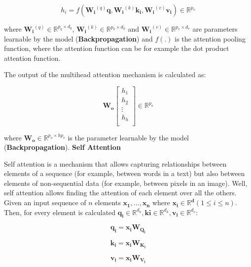 \begin{equation}
h_{i}=f(\mathbf{W_{i}}^{(q)}\mathbf{q},\mathbf{W_{i}}^{(k)}\mathbf{k_{i}},\mathbf{W_{i}}^{(v)}\mathbf{v_{i}}) \in \mathbb{R}^{p_{v}}
\end{equation}

where $\mathbf{W_{i}}^{(q)} \in \mathbb{R}^{p_{q} \times d_{q}}$, $\mathbf{W_{i}}^{(k)} \in \mathbb{R}^{p_{k} \times d_{k}}$ and $\mathbf{W_{i}}^{(v)} \in \mathbb{R}^{p_{v} \times d_{v}}$ are parameters learnable by the model (\textbf{Backpropagation}) and $f(.)$ is the attention pooling function, where the attention function can be for example the dot product attention function. 

The output of the multihead attention mechanism is calculated as:

\begin{equation}
    \mathbf{W_{o}} \begin{bmatrix}
h_1 \\
h_2 \\
\vdots \\
h_h \\
\end{bmatrix} \in \mathbb{R}^{p_{o}}
\end{equation}

where $\mathbf{W_{o}} \in \mathbb{R}^{p_{o} \times hp_{v}}$ is the parameter learnable by the model (\textbf{Backpropagation}). 
\newpage
\textbf{Self Attention}

Self attention is a mechanism that allows capturing relationships between elements of a sequence (for example, between words in a text) but also between elements of non-sequential data (for example, between pixels in an image). Well, self attention allows finding the attention of each element over all the others. Given an input sequence of $n$ elements $\mathbf{x_{1}},...,\mathbf{x_{n}}$ where $\mathbf{x_{i} \in \mathbb{R}^{d}} (1 \leq i \leq n)$. Then, for every element is calculated $\mathbf{q_{i}} \in \mathbb{R}^{d_{k}}, \mathbf{k{i}} \in \mathbb{R}^{d_{k}}, \mathbf{v_{i}} \in \mathbb{R}^{d_{v}}$:

\begin{equation}
    \mathbf{q_{i}}=\mathbf{x_{i}}\mathbf{W_{Q_{i}}}
\end{equation}

\begin{equation}
    \mathbf{k_{i}}=\mathbf{x_{i}}\mathbf{W_{K_{i}}}
\end{equation}

\begin{equation}
    \mathbf{v_{i}}=\mathbf{x_{i}}\mathbf{W_{V_{i}}}
\end{equation}

